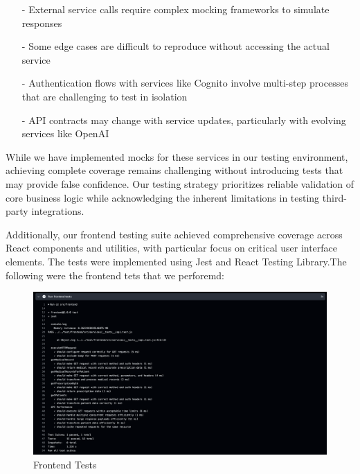 \documentclass[12pt, titlepage]{article}
\begin{document}
\begin{itemize}
    \item[-] External service calls require complex mocking frameworks to simulate responses
    \item[-] Some edge cases are difficult to reproduce without accessing the actual service
    \item[-] Authentication flows with services like Cognito involve multi-step processes that are challenging to test in isolation
    \item[-] API contracts may change with service updates, particularly with evolving services like OpenAI
\end{itemize}

\noindent While we have implemented mocks for these services in our testing environment, achieving complete coverage remains challenging without introducing tests that may provide false confidence. Our testing strategy prioritizes reliable validation of core business logic while acknowledging the inherent limitations in testing third-party integrations.
\vspace{10pt}

\noindent Additionally, our frontend testing suite achieved comprehensive coverage across React components and utilities, with particular focus on critical user interface elements. The tests were implemented using Jest and React Testing Library.The following were the frontend tets that we perforemd:
\begin{figure}[ht!]
  \centering
  \includegraphics[scale=0.35]{../assets/front.png}
  \caption{Frontend Tests}
  \label{fig:Coverage}
\end{figure}

\newpage


\end{document}
